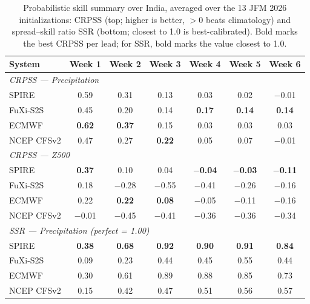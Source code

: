 \documentclass[11pt,a4paper]{article}
\begin{document}
\begin{table}[t]
  \centering
  \small
  \setlength{\tabcolsep}{5pt}
  \caption{Probabilistic skill summary over India, averaged over the 13
  JFM 2026 initializations: CRPSS (top; higher is better, ${>}0$ beats
  climatology) and spread--skill ratio SSR (bottom; closest to 1.0 is
  best-calibrated). Bold marks the best CRPSS per lead; for SSR, bold
  marks the value closest to 1.0.}
  \label{tab:prob}
  \begin{tabular}{lcccccc}
    \toprule
    System & Week 1 & Week 2 & Week 3 & Week 4 & Week 5 & Week 6 \\
    \midrule
    \multicolumn{7}{l}{\emph{CRPSS --- Precipitation}}\\
    SPIRE      & 0.59          & 0.31 & 0.13          & 0.03          & 0.02          & $-$0.01 \\
    FuXi-S2S   & 0.45          & 0.20 & 0.14          & \textbf{0.17} & \textbf{0.14} & \textbf{0.14} \\
    ECMWF      & \textbf{0.62} & \textbf{0.37} & 0.15     & 0.03          & 0.03          & 0.03 \\
    NCEP CFSv2 & 0.47          & 0.27 & \textbf{0.22} & 0.05          & 0.07          & $-$0.01 \\
    \midrule
    \multicolumn{7}{l}{\emph{CRPSS --- Z500}}\\
    SPIRE      & \textbf{0.37} & 0.10    & 0.04          & \textbf{$-$0.04} & \textbf{$-$0.03} & \textbf{$-$0.11} \\
    FuXi-S2S   & 0.18          & $-$0.28 & $-$0.55       & $-$0.41          & $-$0.26          & $-$0.16 \\
    ECMWF      & 0.22          & \textbf{0.22} & \textbf{0.08} & $-$0.05       & $-$0.11          & $-$0.16 \\
    NCEP CFSv2 & $-$0.01       & $-$0.45 & $-$0.41       & $-$0.36          & $-$0.36          & $-$0.34 \\
    \midrule
    \multicolumn{7}{l}{\emph{SSR --- Precipitation (perfect = 1.00)}}\\
    SPIRE      & \textbf{0.38} & \textbf{0.68} & \textbf{0.92} & \textbf{0.90} & \textbf{0.91} & \textbf{0.84} \\
    FuXi-S2S   & 0.09          & 0.23          & 0.44          & 0.45          & 0.55          & 0.44 \\
    ECMWF      & 0.30          & 0.61          & 0.89          & 0.88          & 0.85          & 0.73 \\
    NCEP CFSv2 & 0.15          & 0.42          & 0.47          & 0.51          & 0.56          & 0.57 \\

\end{tabular}
\end{table}
\end{document}
